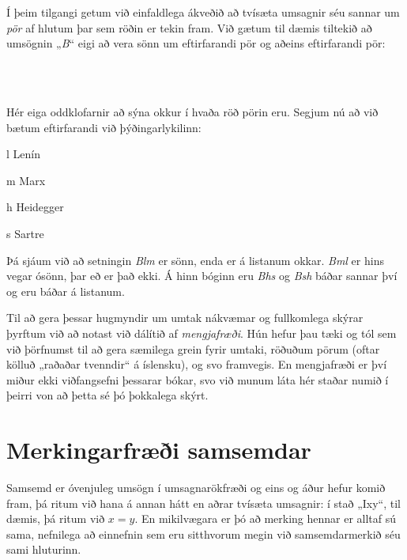 Í þeim tilgangi getum við einfaldlega ákveðið að tvísæta umsagnir séu sannar um \emph{pör} af hlutum þar sem röðin er tekin fram. Við gætum til dæmis tiltekið að umsögnin „\emph{B}“ eigi að vera sönn um eftirfarandi pör og aðeins eftirfarandi pör:
	\begin{center}
		\\
		\\
	\end{center}
Hér eiga oddklofarnir að sýna okkur í hvaða röð pörin eru. Segjum nú að við bætum eftirfarandi við þýðingarlykilinn:
	\begin{ekey}
		\item[l] Lenín
		\item[m] Marx
		\item[h] Heidegger
		\item[s] Sartre
	\end{ekey}
Þá sjáum við að setningin \emph{Blm} er sönn, enda er  á listanum okkar. \emph{Bml} er hins vegar ósönn, þar eð  er það ekki. Á hinn bóginn eru \emph{Bhs} og \emph{Bsh} báðar sannar því  og  eru báðar á listanum.

Til að gera þessar hugmyndir um umtak nákvæmar og fullkomlega skýrar þyrftum við að notast við dálítið af \emph{mengjafræði}. Hún hefur þau tæki og tól sem við þörfnumst til að gera sæmilega grein fyrir umtaki, röðuðum pörum (oftar kölluð „raðaðar tvenndir“ á íslensku), og svo framvegis. En mengjafræði er því miður ekki viðfangsefni þessarar bókar, svo við munum láta hér staðar numið í þeirri von að þetta sé þó þokkalega skýrt.

\section{Merkingarfræði samsemdar}
Samsemd er óvenjuleg umsögn í umsagnarökfræði og eins og áður hefur komið fram, þá ritum við hana á annan hátt en aðrar tvísæta umsagnir: í stað „Ixy“, til dæmis, þá ritum við $x=y$. En mikilvægara er þó að merking hennar er alltaf sú sama, nefnilega að einnefnin sem eru sitthvorum megin við samsemdarmerkið séu sami hluturinn. 

